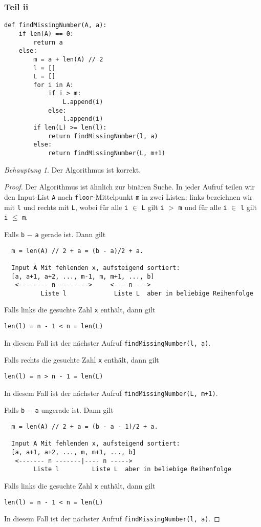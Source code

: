 \documentclass[a5paper]{article}
\newcommand{\mt}{\texttt}
\theoremstyle{remark}
\newtheorem*{Behauptung}{Behauptung}
\begin{document}
\subsubsection{Teil ii}
\begin{verbatim}
def findMissingNumber(A, a):
    if len(A) == 0:
        return a
    else:
        m = a + len(A) // 2
        l = []
        L = []
        for i in A:
            if i > m:
                L.append(i)
            else:
                l.append(i)
        if len(L) >= len(l):
            return findMissingNumber(l, a)
        else:
            return findMissingNumber(L, m+1)
\end{verbatim}
\begin{Behauptung}
  Der Algorithmus ist korrekt.
\end{Behauptung}
\begin{proof}
  Der Algorithmus ist ähnlich zur binären Suche.  In jeder Aufruf
  teilen wir den Input-List \mt{A} nach \mt{floor}-Mittelpunkt \mt{m} in zwei
  Listen: links bezeichnen wir mit \mt{l} und rechts mit \mt{L}, wobei
  für alle \mt{i} \(\in\) \mt{L} gilt \mt{i} \(>\) \mt{m} und für alle
  \mt{i} \(\in\) \mt{l} gilt \mt{i} \(\le\) \mt{m}.

  Falls \mt{b} \(-\) \mt{a} gerade ist. Dann gilt
\begin{verbatim}
  m = len(A) // 2 + a = (b - a)/2 + a.

  Input A Mit fehlenden x, aufsteigend sortiert:
  [a, a+1, a+2, ..., m-1, m, m+1, ..., b]
   <-------- n -------->     <--- n --->
          Liste l             Liste L  aber in beliebige Reihenfolge
\end{verbatim}
  Falls links die gesuchte Zahl \mt{x} enthält, dann gilt
\begin{verbatim}
len(l) = n - 1 < n = len(L)
\end{verbatim}
  In diesem Fall ist der nächster Aufruf \mt{findMissingNumber(l, a)}.

  Falls rechts die gesuchte Zahl \mt{x} enthält, dann gilt
\begin{verbatim}
len(l) = n > n - 1 = len(L)
\end{verbatim}
  In diesem Fall ist der nächster Aufruf \mt{findMissingNumber(L, m+1)}.

  Falls \mt{b} \(-\) \mt{a} ungerade ist. Dann gilt
\begin{verbatim}
  m = len(A) // 2 + a = (b - a - 1)/2 + a.

  Input A Mit fehlenden x, aufsteigend sortiert:
  [a, a+1, a+2, ..., m, m+1, ..., b]
   <------- n -------|---- n ----->
        Liste l         Liste L  aber in beliebige Reihenfolge
\end{verbatim}
  Falls links die gesuchte Zahl \mt{x} enthält, dann gilt
\begin{verbatim}
len(l) = n - 1 < n = len(L)
\end{verbatim}
  In diesem Fall ist der nächster Aufruf \mt{findMissingNumber(l, a)}.


\end{proof}
\end{document}
